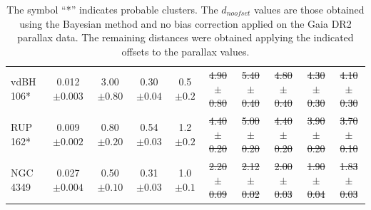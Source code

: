 \documentclass[draft]{aa}
\providecommand{\DIFaddtex}[1]{{\protect\color{blue}\uwave{#1}}} %
\providecommand{\DIFdeltex}[1]{{\protect\color{red}\sout{#1}}}                      %
\providecommand{\DIFaddFL}[1]{\DIFadd{#1}} %
\providecommand{\DIFdelFL}[1]{\DIFdel{#1}} %
\providecommand{\DIFaddbeginFL}{} %
\providecommand{\DIFaddendFL}{} %
\providecommand{\DIFdelbeginFL}{} %
\providecommand{\DIFdelendFL}{} %
\providecommand{\DIFadd}[1]{\texorpdfstring{\DIFaddtex{#1}}{#1}} %
\providecommand{\DIFdel}[1]{\texorpdfstring{\DIFdeltex{#1}}{}} %
\newcommand{\DIFscaledelfig}{0.5}
\newlength{\DIFdelgraphicswidth} %
\newlength{\DIFdelgraphicsheight} %
\newcommand{\DIFaddincludegraphics}[2][]{{\color{blue}\fbox{\DIFOincludegraphics[#1]{#2}}}} %
\newcommand{\DIFdelincludegraphics}[2][]{%
\sbox{\DIFdelgraphicsbox}{\DIFOincludegraphics[#1]{#2}}%
\settoboxwidth{\DIFdelgraphicswidth}{\DIFdelgraphicsbox} %
\settoboxtotalheight{\DIFdelgraphicsheight}{\DIFdelgraphicsbox} %
\scalebox{\DIFscaledelfig}{%
\parbox[b]{\DIFdelgraphicswidth}{\usebox{\DIFdelgraphicsbox}\\[-\baselineskip] \rule{\DIFdelgraphicswidth}{0em}}\llap{\resizebox{\DIFdelgraphicswidth}{\DIFdelgraphicsheight}{%
\setlength{\unitlength}{\DIFdelgraphicswidth}%
\begin{picture}(1,1)%
\thicklines\linethickness{2pt} %
{\color[rgb]{1,0,0}\put(0,0){\framebox(1,1){}}}%
{\color[rgb]{1,0,0}\put(0,0){\line( 1,1){1}}}%
{\color[rgb]{1,0,0}\put(0,1){\line(1,-1){1}}}%
\end{picture}%
}\hspace*{3pt}}} %
} %
\DeclareRobustCommand{\DIFaddbeginFL}{\DIFOaddbeginFL \let\includegraphics\DIFaddincludegraphics} %
\DeclareRobustCommand{\DIFaddendFL}{\DIFOaddendFL \let\includegraphics\DIFOincludegraphics} %
\DeclareRobustCommand{\DIFdelbeginFL}{\DIFOdelbeginFL \let\includegraphics\DIFdelincludegraphics} %
\DeclareRobustCommand{\DIFdelendFL}{\DIFOaddendFL \let\includegraphics\DIFOincludegraphics} %
\begin{document}
\begin{table}[ht]
\begin{tabular}{lccccccccc}
 vdBH 106* & 0.012$\pm0.003$ & 3.00$\pm0.80$ & 0.30$\pm0.04$ & 0.5$\pm0.2$ &
 \DIFdelbeginFL \DIFdelFL{4.90$\pm$0.80 }\DIFdelendFL %
 \DIFaddbeginFL \DIFaddFL{$4.87\pm0.81$ }\DIFaddendFL & \DIFdelbeginFL \DIFdelFL{5.40$\pm$0.40 }\DIFdelendFL \DIFaddbeginFL \DIFaddFL{$5.41\pm0.39$ }\DIFaddendFL & \DIFdelbeginFL \DIFdelFL{4.80$\pm$0.40 }\DIFdelendFL \DIFaddbeginFL \DIFaddFL{$4.77\pm0.39$ }\DIFaddendFL & \DIFdelbeginFL \DIFdelFL{4.30$\pm$0.30 }\DIFdelendFL \DIFaddbeginFL \DIFaddFL{$4.31\pm0.33$ }\DIFaddendFL & \DIFdelbeginFL \DIFdelFL{4.10$\pm$0.30}\DIFdelendFL \DIFaddbeginFL \DIFaddFL{$4.06\pm0.30$}\DIFaddendFL \\
 RUP 162* & 0.009$\pm0.002$ & 0.80$\pm0.20$ & 0.54$\pm0.03$ & 1.2$\pm0.2$ &
 \DIFdelbeginFL \DIFdelFL{4.40$\pm$0.20 }\DIFdelendFL %
 \DIFaddbeginFL \DIFaddFL{$4.43\pm0.20$ }\DIFaddendFL & \DIFdelbeginFL \DIFdelFL{5.00$\pm$0.20 }\DIFdelendFL \DIFaddbeginFL \DIFaddFL{$4.97\pm0.20$ }\DIFaddendFL & \DIFdelbeginFL \DIFdelFL{4.40$\pm$0.20 }\DIFdelendFL \DIFaddbeginFL \DIFaddFL{$4.37\pm0.18$ }\DIFaddendFL & \DIFdelbeginFL \DIFdelFL{3.90$\pm$0.20 }\DIFdelendFL \DIFaddbeginFL \DIFaddFL{$3.94\pm0.15$ }\DIFaddendFL & \DIFdelbeginFL \DIFdelFL{3.70$\pm$0.10}\DIFdelendFL \DIFaddbeginFL \DIFaddFL{$3.66\pm0.13$}\DIFaddendFL \\
 NGC 4349 & 0.027$\pm0.004$ & 0.50$\pm0.10$ & 0.31$\pm0.03$ & 1.0$\pm0.1$ &
 \DIFdelbeginFL \DIFdelFL{2.20$\pm$0.09 }\DIFdelendFL %
 \DIFaddbeginFL \DIFaddFL{$2.20\pm0.09$ }\DIFaddendFL & \DIFdelbeginFL \DIFdelFL{2.12$\pm$0.02 }\DIFdelendFL \DIFaddbeginFL \DIFaddFL{$2.12\pm0.02$ }\DIFaddendFL & \DIFdelbeginFL \DIFdelFL{2.00$\pm$0.03 }\DIFdelendFL \DIFaddbeginFL \DIFaddFL{$2.00\pm0.03$ }\DIFaddendFL & \DIFdelbeginFL \DIFdelFL{1.90$\pm$0.04 }\DIFdelendFL \DIFaddbeginFL \DIFaddFL{$1.90\pm0.04$ }\DIFaddendFL & \DIFdelbeginFL \DIFdelFL{1.83$\pm$0.03}\DIFdelendFL \DIFaddbeginFL \DIFaddFL{$1.83\pm0.03$}\DIFaddendFL \\
\hline
\end{tabular}
\caption{The symbol ``*'' indicates probable clusters. The $d_{noofset}$ values
are those obtained using the Bayesian method and no bias correction applied on
the Gaia DR2 parallax data. The remaining distances were obtained applying the
indicated offsets to the parallax values.}
\label{tab:final_tab}
\end{table}
\end{document}
